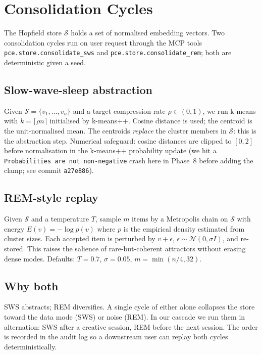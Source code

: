 \section{Consolidation Cycles}\label{app:consolidation}

\sloppy

The Hopfield store $\mathcal{S}$ holds a set of normalised embedding vectors. Two consolidation cycles run on user request through the MCP tools \texttt{pce.store.consolidate\_sws} and \texttt{pce.store.consolidate\_rem}; both are deterministic given a seed.

\subsection{Slow-wave-sleep abstraction}

Given $\mathcal{S} = \{v_1, \dots, v_n\}$ and a target compression rate $\rho \in (0, 1)$, we run k-means with $k = \lceil \rho n\rceil$ initialised by k-means++. Cosine distance is used; the centroid is the unit-normalised mean. The centroids \emph{replace} the cluster members in $\mathcal{S}$: this is the abstraction step. Numerical safeguard: cosine distances are clipped to $[0, 2]$ before normalisation in the k-means++ probability update (we hit a \texttt{Probabilities are not non-negative} crash here in Phase~8 before adding the clamp; see commit \texttt{a27e886}).

\subsection{REM-style replay}

Given $\mathcal{S}$ and a temperature $T$, sample $m$ items by a Metropolis chain on $\mathcal{S}$ with energy $E(v) = -\log p(v)$ where $p$ is the empirical density estimated from cluster sizes. Each accepted item is perturbed by $v\!+\!\epsilon$, $\epsilon\sim\mathcal{N}(0, \sigma I)$, and re-stored. This raises the salience of rare-but-coherent attractors without erasing dense modes. Defaults: $T{=}0.7$, $\sigma{=}0.05$, $m=\min(n/4, 32)$.

\subsection{Why both}

SWS abstracts; REM diversifies. A single cycle of either alone collapses the store toward the data mode (SWS) or noise (REM). In our cascade we run them in alternation: SWS after a creative session, REM before the next session. The order is recorded in the audit log so a downstream user can replay both cycles deterministically.
